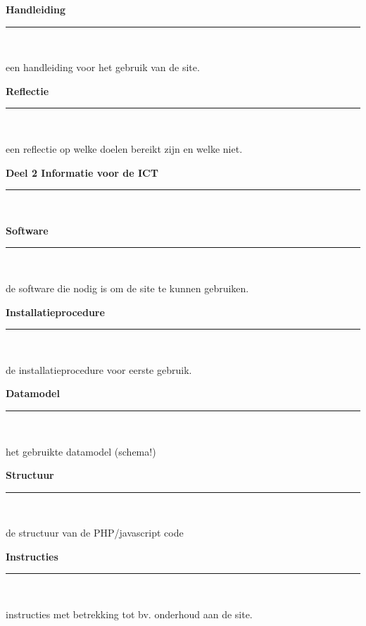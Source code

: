 \documentclass[a4paper,12pt]{article}
\newcommand{\HRule}{\rule{\linewidth}{0.5mm}}
\begin{document}
\newpage
\begin{center}
{ \LARGE \bfseries Handleiding}\\[0.1cm]
\HRule \\[0.5cm]
\end{center}
een handleiding voor het gebruik van de site.


\newpage
\begin{center}
{ \LARGE \bfseries Reflectie}\\[0.1cm]
\HRule \\[0.5cm]
\end{center}
een reflectie op welke doelen bereikt zijn en welke niet.


\newpage
\begin{center}
{\LARGE \bfseries Deel 2 Informatie voor de ICT}\\[0.1cm]
\HRule \\[0.5cm]
\end{center}


\newpage
\begin{center}
{\LARGE \bfseries Software}\\[0.1cm]
\HRule \\[0.5cm]
\end{center}
de software die nodig is om de site te kunnen gebruiken.

\newpage
\begin{center}
{\LARGE \bfseries Installatieprocedure}\\[0.1cm]
\HRule \\[0.5cm]
\end{center}
de installatieprocedure voor eerste gebruik.

\newpage
\begin{center}
{\LARGE \bfseries Datamodel}\\[0.1cm]
\HRule \\[0.5cm]
\end{center}
het gebruikte datamodel (schema!)

\newpage
\begin{center}
{\LARGE \bfseries Structuur}\\[0.1cm]
\HRule \\[0.5cm]
\end{center}
de structuur van de PHP/javascript code

\newpage
\begin{center}
{\LARGE \bfseries Instructies}\\[0.1cm]
\HRule \\[0.5cm]
\end{center}
instructies met betrekking tot bv. onderhoud aan de site.
\end{document}
